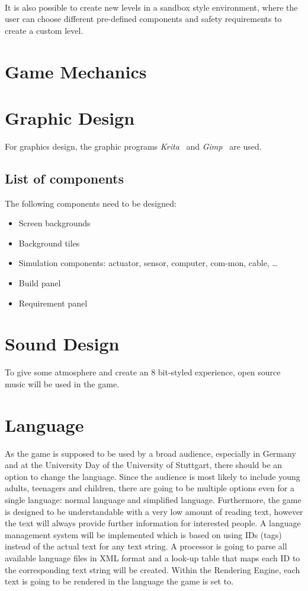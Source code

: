 \\

It is also possible to create new levels in a sandbox style environment, where the user can choose different pre-defined components and
safety requirements to create a custom level.

\section{Game Mechanics}\label{sec:game-mechanics}

\section{Graphic Design}\label{sec:graphic-design}
For graphics design, the graphic programs \textit{Krita}~\cite{foundation_2020} and \textit{Gimp}~\cite{gimp} are used.

\subsection{List of components}\label{subsec:list-of-components}
The following components need to be designed:
\begin{itemize}
    \item Screen backgrounds
    \item Background tiles
    \item Simulation components: actuator, sensor, computer, com-mon, cable, \ldots
    \item Build panel
    \item Requirement panel
\end{itemize}

\section{Sound Design}\label{sec:sound-design}
To give some atmosphere and create an 8 bit-styled experience, open source music will be used in the game.

\section{Language}\label{sec:language}
As the game is supposed to be used by a broad audience, especially in Germany and at the University Day of the University of Stuttgart, there should be an option
to change the language.
Since the audience is most likely to include young adults, teenagers and children, there are going to be multiple options even for a single language:
normal language and simplified language.
Furthermore, the game is designed to be understandable with a very low amount of reading text, however the text will always provide further information for interested people.
A language management system will be implemented which is based on using IDs (tags) instead of the actual text for any text string.
A processor is going to parse all available language files in XML format and a look-up table that maps each ID to the corresponding text string will be created.
Within the Rendering Engine, each text is going to be rendered in the language the game is set to.

